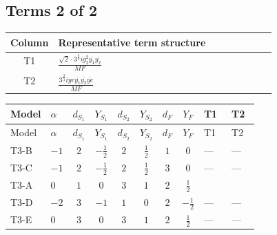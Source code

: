 \documentclass[8pt]{article}
\begin{document}
\begin{landscape}
\subsection*{Terms 2 of 2}
\begin{center}
\begin{tabular}{@{}c >{\raggedright\arraybackslash}p{0.82\linewidth}@{}}
\toprule
Column & Representative term structure \\
\midrule
T1 & \(\displaystyle \frac{\sqrt{2} \cdot 3^{\frac{3}{4}} i g_{2}^{2} \overline{y_{1}} \overline{y_{2}}}{MF}\) \\
\midrule
T2 & \(\displaystyle \frac{3^{\frac{3}{4}} i ye \overline{y_{1}} \overline{y_{2}} \overline{ye}}{MF}\) \\
\midrule
\bottomrule
\end{tabular}
\end{center}
\smallskip
\tiny
\begin{longtable}{@{}llcccccc >{\raggedright\arraybackslash}p{0.21\linewidth} >{\raggedright\arraybackslash}p{0.21\linewidth}@{}}
\toprule
Model & $\alpha$ & $d_{S_1}$ & $Y_{S_1}$ & $d_{S_2}$ & $Y_{S_2}$ & $d_F$ & $Y_F$ & T1 & T2 \\
\midrule
\endfirsthead
\toprule
Model & $\alpha$ & $d_{S_1}$ & $Y_{S_1}$ & $d_{S_2}$ & $Y_{S_2}$ & $d_F$ & $Y_F$ & T1 & T2 \\
\midrule
\endhead
T3-B & $-1$ & $2$ & $-\frac{1}{2}$ & $2$ & $\frac{1}{2}$ & $1$ & $0$ & --- & --- \\
\midrule
T3-C & $-1$ & $2$ & $-\frac{1}{2}$ & $2$ & $\frac{1}{2}$ & $3$ & $0$ & --- & --- \\
\midrule
T3-A & $0$ & $1$ & $0$ & $3$ & $1$ & $2$ & $\frac{1}{2}$ & \scriptsize\adjustbox{max width=\linewidth}{$\begin{gathered} - \frac{\sqrt{2} \cdot 3^{\frac{3}{4}} i g_{2}^{2} \overline{y_{1}} \overline{y_{2}}}{3 MF}\end{gathered}$} & \scriptsize\adjustbox{max width=\linewidth}{$\begin{gathered} \frac{3^{\frac{3}{4}} i ye \overline{y_{1}} \overline{y_{2}} \overline{ye}}{12 MF}\end{gathered}$} \\
\midrule
T3-D & $-2$ & $3$ & $-1$ & $1$ & $0$ & $2$ & $-\frac{1}{2}$ & --- & --- \\
\midrule
T3-E & $0$ & $3$ & $0$ & $3$ & $1$ & $2$ & $\frac{1}{2}$ & --- & --- \\
\midrule
\bottomrule
\end{longtable}
\clearpage

\end{landscape}
\end{document}
